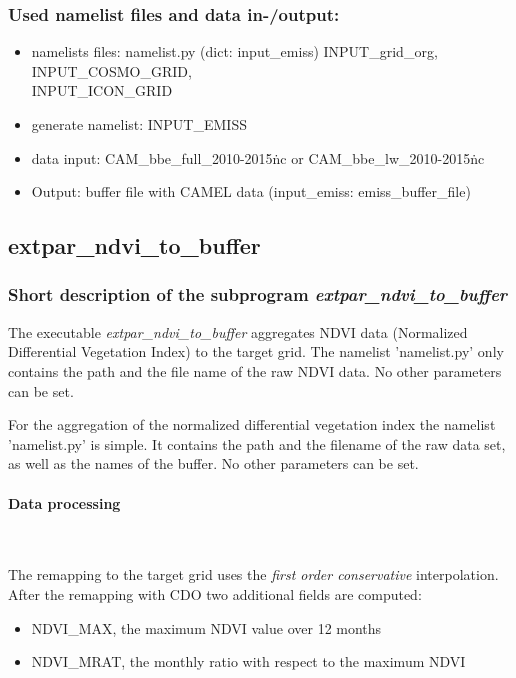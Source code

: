 \documentclass[a4paper,10pt,DIV14,BCOR1cm,titlepage,twoside]{scrartcl}
\begin{document}
\subsubsection{Used namelist files and data in-/output:}
\begin{itemize}
  \item namelists files: namelist.py (dict: input\_emiss) INPUT\_grid\_org, INPUT\_COSMO\_GRID, \\
          INPUT\_ICON\_GRID
  \item generate namelist: INPUT\_EMISS
  \item data input: CAM\_bbe\_full\_2010-2015\.nc or CAM\_bbe\_lw\_2010-2015\.nc
  \item Output: buffer file with CAMEL data (input\_emiss: emiss\_buffer\_file)
\end{itemize}
\subsection{extpar\_ndvi\_to\_buffer}\label{extpar_ndvi_to_buffer} \subsubsection{Short description of the subprogram \textit{extpar\_ndvi\_to\_buffer}} The executable \textit{extpar\_ndvi\_to\_buffer} aggregates NDVI data (Normalized Differential Vegetation Index) to the target grid. The namelist 'namelist.py' only contains the path and the file name of the raw NDVI data. No other parameters can be set. \par\medskip\noindent For the aggregation of the normalized differential vegetation index the namelist 'namelist.py' is simple. It contains the path and the filename of the raw data set, as well as the names of the buffer. No other parameters can be set. \par\medskip\noindent \paragraph{Data processing} \ \par\medskip\noindent
The remapping to the target grid uses the \textit{first order conservative} interpolation. After the remapping with CDO two additional fields are computed:
\begin{itemize}
  \item NDVI\_MAX, the maximum NDVI value over 12 months
  \item NDVI\_MRAT, the monthly ratio with respect to the maximum NDVI
\end{itemize}
\end{document}
